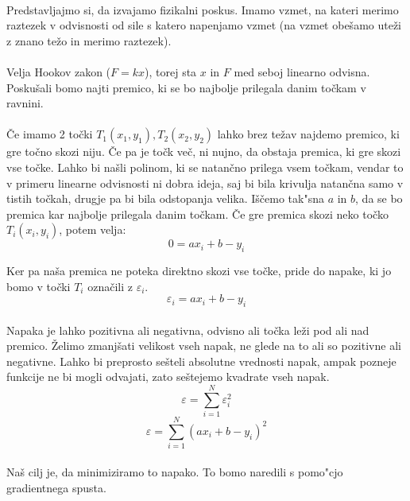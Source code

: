 \paragraph{}
Predstavljajmo si, da izvajamo fizikalni poskus. Imamo vzmet, na kateri merimo raztezek v odvisnosti od sile s katero napenjamo vzmet (na vzmet obešamo uteži z znano težo in merimo raztezek).

\paragraph{}
Velja Hookov zakon ($F = k x$), torej sta $x$ in $F$ med seboj linearno odvisna. Poskušali bomo najti premico, ki se bo najbolje prilegala danim točkam v ravnini.

\paragraph{}
Če imamo 2 točki $T_1(x_1, y_1), T_2(x_2, y_2)$ lahko brez težav najdemo premico, ki gre točno skozi niju. Če pa je točk več, ni nujno, da obstaja premica, ki gre skozi vse točke. Lahko bi našli polinom, ki se natančno prilega vsem točkam, vendar to v primeru linearne odvisnosti ni dobra ideja, saj bi bila krivulja natančna samo v tistih točkah, drugje pa bi bila odstopanja velika. Iščemo tak"sna $a$ in $b$, da se bo premica kar najbolje prilegala danim točkam. Če gre premica skozi neko točko $T_i(x_i, y_i)$, potem velja:
$$0 = a x_i + b - y_i$$

Ker pa naša premica ne poteka direktno skozi vse točke, pride do napake, ki jo bomo v točki $T_i$ označili z $\varepsilon_i$.
$$\varepsilon_i = a x_i + b - y_i$$

\paragraph{}
Napaka je lahko pozitivna ali negativna, odvisno ali točka leži pod ali nad premico. Želimo zmanjšati velikost vseh napak, ne glede na to ali so pozitivne ali negativne. Lahko bi preprosto sešteli absolutne vrednosti napak, ampak pozneje funkcije ne bi mogli odvajati, zato seštejemo kvadrate vseh napak.
$$\varepsilon = \sum_{i=1}^{N} \varepsilon_i^2$$
$$\varepsilon = \sum_{i=1}^{N} (a x_i + b - y_i)^2$$

\paragraph{}
Naš cilj je, da minimiziramo to napako. To bomo naredili s pomo"cjo gradientnega spusta.